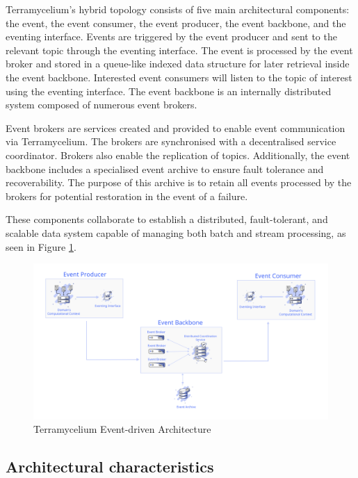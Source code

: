 \documentclass[review]{elsarticle}
\begin{document}
Terramycelium's hybrid topology consists of five main architectural components: the event, the event consumer, the event producer, the event backbone, and the eventing interface. Events are triggered by the event producer and sent to the relevant topic through the eventing interface. The event is processed by the event broker and stored in a queue-like indexed data structure for later retrieval inside the event backbone. Interested event consumers will listen to the topic of interest using the eventing interface. The event backbone is an internally distributed system composed of numerous event brokers. 

Event brokers are services created and provided to enable event communication via Terramycelium. The brokers are synchronised with a decentralised service coordinator. Brokers also enable the replication of topics. Additionally, the event backbone includes a specialised event archive to ensure fault tolerance and recoverability. The purpose of this archive is to retain all events processed by the brokers for potential restoration in the event of a failure. 

These components collaborate to establish a distributed, fault-tolerant, and scalable data system capable of managing both batch and stream processing, as seen in Figure \ref{fig:eventDrivenArchitecture}. 

\begin{figure}[h]

  \centering

  \includegraphics[width=13cm]{images/Event-architecture.png}

  \caption{Terramycelium Event-driven Architecture}

  \label{fig:eventDrivenArchitecture}

\end{figure}

\subsection{Architectural characteristics}
\end{document}
